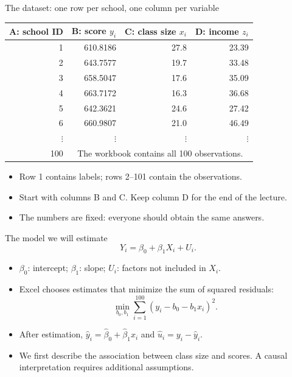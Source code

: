 \documentclass[notes,10pt,aspectratio=169]{beamer}
\begin{document}
\begin{frame}{The dataset: one row per school, one column per variable}
\begin{center}
\begin{tabular}{rrrr}
\toprule
A: school ID & B: score $y_i$ & C: class size $x_i$ & D: income $z_i$\\
\midrule
1 & 610.8186 & 27.8 & 23.39\\
2 & 643.7577 & 19.7 & 33.48\\
3 & 658.5047 & 17.6 & 35.09\\
4 & 663.7172 & 16.3 & 36.68\\
5 & 642.3621 & 24.6 & 27.42\\
6 & 660.9807 & 21.0 & 46.49\\
$\vdots$ & $\vdots$ & $\vdots$ & $\vdots$\\
100 & \multicolumn{3}{c}{The workbook contains all 100 observations.}\\
\bottomrule
\end{tabular}
\end{center}
\begin{itemize}
\item Row 1 contains labels; rows 2--101 contain the observations.
\item Start with columns B and C. Keep column D for the end of the lecture.
\item The numbers are fixed: everyone should obtain the same answers.
\end{itemize}
\end{frame}

\begin{frame}{The model we will estimate}
\[
Y_i=\beta_0+\beta_1X_i+U_i.
\]
\begin{itemize}
\setlength{\itemsep}{8pt}
\item $\beta_0$: intercept; $\beta_1$: slope; $U_i$: factors not included in $X_i$.
\item Excel chooses estimates that minimize the sum of squared residuals:
\[
\min_{b_0,b_1}\sum_{i=1}^{100}(y_i-b_0-b_1x_i)^2.
\]
\item After estimation, $\hat y_i=\hat\beta_0+\hat\beta_1x_i$ and $\hat u_i=y_i-\hat y_i$.
\item We first describe the association between class size and scores. A causal interpretation requires additional assumptions.
\end{itemize}
\end{frame}
\end{document}
